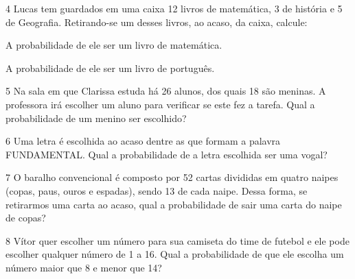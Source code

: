 \num{4} Lucas tem guardados em uma caixa 12 livros de matemática, 3 de
história e 5 de Geografia. Retirando-se um desses livros, ao acaso, da
caixa, calcule:

\begin{escolha}
\item
  A probabilidade de ele ser um livro de matemática.


\item
  A probabilidade de ele ser um livro de português.

\end{escolha}


\num{5} Na sala em que Clarissa estuda há 26 alunos, dos quais 18 são
meninas. A professora irá escolher um aluno para verificar se este fez a
tarefa. Qual a probabilidade de um menino ser escolhido?



\num{6} Uma letra é escolhida ao acaso dentre as que formam a palavra
FUNDAMENTAL. Qual a probabilidade de a letra escolhida ser uma vogal?



\num{7} O baralho convencional é composto por 52 cartas divididas em quatro
naipes (copas, paus, ouros e espadas), sendo 13 de cada naipe. Dessa
forma, se retirarmos uma carta ao acaso, qual a probabilidade de sair
uma carta do naipe de copas?



\num{8} Vítor quer escolher um número para sua camiseta do time de futebol
e ele pode escolher qualquer número de 1 a 16. Qual a probabilidade de
que ele escolha um número maior que 8 e menor que 14?



